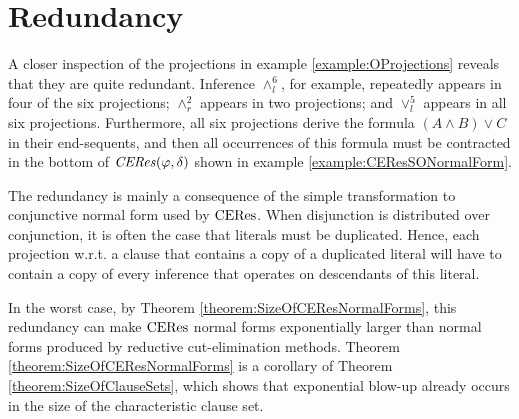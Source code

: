 \section{Redundancy}
\label{sec:Redundancy}

A closer inspection of the projections in example \ref{example:OProjections} reveals that they are quite redundant. Inference $\wedge_l^6$, for example, repeatedly appears in four of the six projections; $\wedge_r^2$ appears in two projections; and $\vee_l^5$ appears in all six projections. Furthermore, all six projections derive the formula $(A \wedge B) \vee C$ in their end-sequents, and then all occurrences of this formula must be contracted in the bottom of $\mathit{CERes}(\varphi,\delta)$ shown in example \ref{example:CEResSONormalForm}. 

The redundancy is mainly a consequence of the simple transformation to conjunctive normal form used by $\mathrm{CERes}$. When disjunction is distributed over conjunction, it is often the case that literals must be duplicated. Hence, each projection w.r.t. a clause that contains a copy of a duplicated literal will have to contain a copy of every inference that operates on descendants of this literal.

In the worst case, by Theorem \ref{theorem:SizeOfCEResNormalForms}, this redundancy can make $\mathrm{CERes}$ normal forms exponentially larger than normal forms produced by reductive cut-elimination methods. Theorem \ref{theorem:SizeOfCEResNormalForms} is a corollary of Theorem \ref{theorem:SizeOfClauseSets}, which shows that exponential blow-up already occurs in the size of the characteristic clause set.



